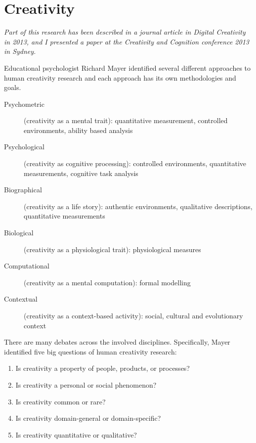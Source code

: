 
\chapter{Creativity}
\label{ch:creativity}

\emph{Part of this research has been described in a journal article in Digital Creativity in 2013, and I presented a paper at the Creativity and Cognition conference 2013 in Sydney.}

\grule{}


Educational psychologist Richard Mayer identified several different approaches to human creativity research and each approach has its own methodologies and goals. \citep[p.453]{Mayer1999}

\begin{description}
  \item [Psychometric] (creativity as a mental trait): quantitative measurement, controlled environments, ability based analysis
  \item [Psychological] (creativity as cognitive processing): controlled environments, quantitative measurements, cognitive task analysis
  \item [Biographical] (creativity as a life story): authentic environments, qualitative descriptions, quantitative measurements
  \item [Biological] (creativity as a physiological trait): physiological measures
  \item [Computational] (creativity as a mental computation): formal modelling
  \item [Contextual] (creativity as a context-based activity): social, cultural and evolutionary context
\end{description}

There are many debates across the involved disciplines. Specifically, Mayer identified five big questions of human creativity research: \citep[p.450-451]{Mayer1999}

\begin{enumerate}
  \item Is creativity a property of people, products, or processes?
  \item Is creativity a personal or social phenomenon?
  \item Is creativity common or rare?
  \item Is creativity domain-general or domain-specific?
  \item Is creativity quantitative or qualitative?
\end{enumerate}

